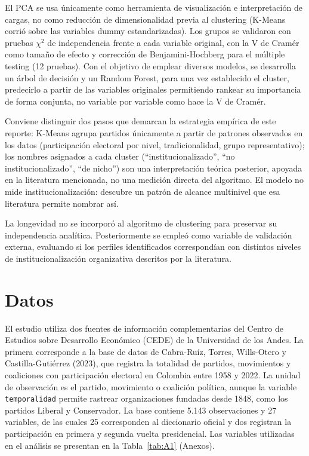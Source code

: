 \documentclass[11pt,letterpaper]{article}
\newcommand{\code}[1]{\texttt{\small #1}}
\begin{document}
El PCA se usa únicamente como herramienta de visualización e interpretación de cargas, no como reducción de dimensionalidad previa al clustering (K-Means corrió sobre las variables dummy estandarizadas). Los grupos se validaron con pruebas $\chi^2$ de independencia frente a cada variable original, con la V de Cramér como tamaño de efecto y corrección de Benjamini-Hochberg para el múltiple testing (12 pruebas). Con el objetivo de emplear diversos modelos, se desarrolla un árbol de decisión y un Random Forest, para una vez establecido el cluster, predecirlo a partir de las variables originales permitiendo rankear su importancia de forma conjunta, no variable por variable como hace la V de Cramér.

Conviene distinguir dos pasos que demarcan la estrategia empírica de este reporte: K-Means agrupa partidos únicamente a partir de patrones observados en los datos (participación electoral por nivel, tradicionalidad, grupo representativo); los nombres asignados a cada cluster (``institucionalizado'', ``no institucionalizado'', ``de nicho'') son una interpretación teórica posterior, apoyada en la literatura mencionada, no una medición directa del algoritmo. El modelo no mide institucionalización: descubre un patrón de alcance multinivel que esa literatura permite nombrar así.

La longevidad no se incorporó al algoritmo de clustering para preservar su independencia analítica. Posteriormente se empleó como variable de validación externa, evaluando si los perfiles identificados correspondían con distintos niveles de institucionalización organizativa descritos por la literatura.

\section{Datos}

El estudio utiliza dos fuentes de información complementarias del Centro de Estudios sobre Desarrollo Económico (CEDE) de la Universidad de los Andes. La primera corresponde a la base de datos de Cabra-Ruíz, Torres, Wills-Otero y Castilla-Gutiérrez (2023), que registra la totalidad de partidos, movimientos y coaliciones con participación electoral en Colombia entre 1958 y 2022. La unidad de observación es el partido, movimiento o coalición política, aunque la variable \code{temporalidad} permite rastrear organizaciones fundadas desde 1848, como los partidos Liberal y Conservador. La base contiene 5.143 observaciones y 27 variables, de las cuales 25 corresponden al diccionario oficial y dos registran la participación en primera y segunda vuelta presidencial. Las variables utilizadas en el análisis se presentan en la Tabla~\ref{tab:A1} (Anexos).
\end{document}
